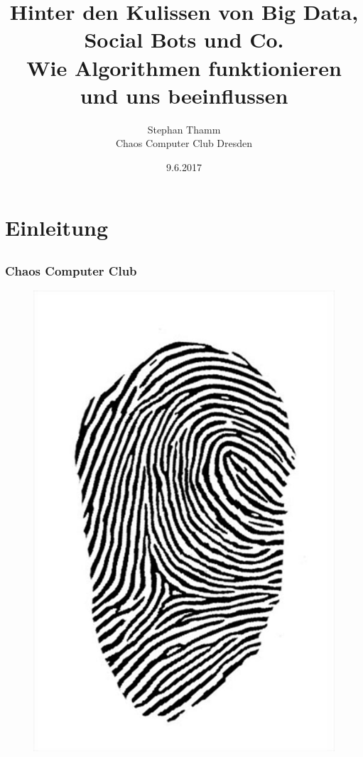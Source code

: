 \documentclass[12pt]{beamer}
\title{\normalsize Hinter den Kulissen von Big Data, Social Bots und Co. \\ Wie Algorithmen funktionieren
und uns beeinflussen}
\author{\small Stephan Thamm\\\large Chaos Computer Club Dresden}
\date{9.6.2017}
\begin{document}
\maketitle

\section{Einleitung}
\subsection{}

\begin{frame}
  \frametitle{Chaos Computer Club}
  \begin{figure}
    \includegraphics[height=0.7\textheight]{img/fingerabdruck.jpg}
  \end{figure}
\end{frame}
\end{document}

